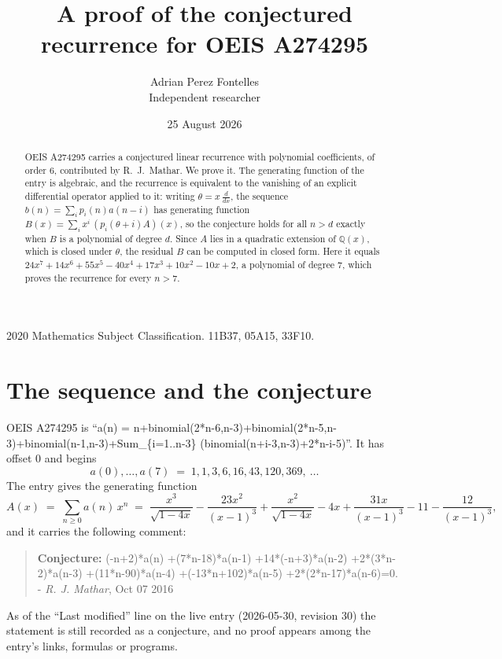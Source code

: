 \documentclass[11pt,a4paper]{article}
\title{A proof of the conjectured recurrence for OEIS A274295}
\author{Adrian Perez Fontelles\\ \small Independent researcher}
\date{25 August 2026}
\theoremstyle{plain}
\theoremstyle{definition}
\begin{document}
\maketitle

\begin{abstract}
OEIS A274295 carries a conjectured linear recurrence with polynomial coefficients, of
order 6, contributed by R.~J.~Mathar. We prove it. The generating function of the
entry is algebraic, and the recurrence is equivalent to the vanishing of an explicit
differential operator applied to it: writing $\theta=x\,\frac{d}{dx}$, the sequence
$b(n)=\sum_{i}p_{i}(n)a(n-i)$ has generating function
$B(x)=\sum_{i}x^{i}\,(p_{i}(\theta+i)A)(x)$, so the conjecture holds for all $n>d$ exactly
when $B$ is a polynomial of degree $d$. Since $A$ lies in a quadratic extension of
$\mathbb{Q}(x)$, which is closed under $\theta$, the residual $B$ can be computed in
closed form. Here it equals $24 x^{7} + 14 x^{6} + 55 x^{5} - 40 x^{4} + 17 x^{3} + 10 x^{2} - 10 x + 2$, a polynomial of degree $7$, which proves
the recurrence for every $n>7$.
\end{abstract}

\noindent\small 2020 Mathematics Subject Classification. 11B37, 05A15, 33F10.\normalsize

\section{The sequence and the conjecture}

OEIS A274295 is ``a(n) = n+binomial(2*n-6,n-3)+binomial(2*n-5,n-3)+binomial(n-1,n-3)+Sum\_\{i=1..n-3\} (binomial(n+i-3,n-3)+2*n-i-5)''. It has offset $0$ and begins
\[
a(0),\dots,a(7)\;=\;1, 1, 3, 6, 16, 43, 120, 369,\ \dots
\]
The entry gives the generating function
\begin{equation}\label{eq:gf}
A(x)\;=\;\sum_{n\ge 0} a(n)\,x^{n}\;=\;\frac{x^{3}}{\sqrt{1 - 4 x}} - \frac{23 x^{2}}{\left(x - 1\right)^{3}} + \frac{x^{2}}{\sqrt{1 - 4 x}} - 4 x + \frac{31 x}{\left(x - 1\right)^{3}} - 11 - \frac{12}{\left(x - 1\right)^{3}} ,
\end{equation}
and it carries the following comment:
\begin{quote}\small
\textbf{Conjecture:} (-n+2)*a(n) +(7*n-18)*a(n-1) +14*(-n+3)*a(n-2) +2*(3*n-2)*a(n-3) +(11*n-90)*a(n-4) +(-13*n+102)*a(n-5) +2*(2*n-17)*a(n-6)=0. - \emph{R. J. Mathar}, Oct 07 2016
\end{quote}
As of the ``Last modified'' line on the live entry (2026-05-30, revision 30) the
statement is still recorded as a conjecture, and no proof appears among the entry's links,
formulas or programs.
\end{document}
